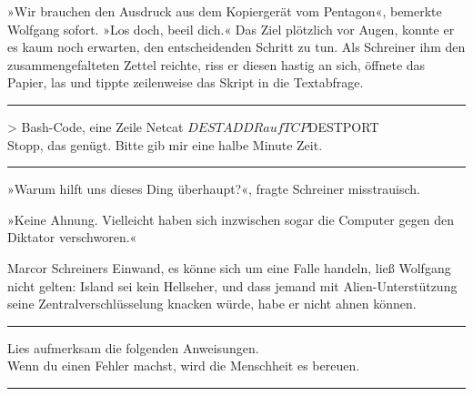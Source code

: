 »Wir brauchen den Ausdruck aus dem Kopiergerät vom Pentagon«, bemerkte Wolfgang sofort. »Los doch, beeil dich.« Das Ziel plötzlich vor Augen, konnte er es kaum noch erwarten, den entscheidenden Schritt zu tun. Als Schreiner ihm den zusammengefalteten Zettel reichte, riss er diesen hastig an sich, öffnete das Papier, las und tippte zeilenweise das Skript in die Textabfrage.

\noindent \parbox{\textwidth}{ \vspace{3ex} \hrule \vspace{3ex}

    \begin{tiny}
    \begin{ttfamily}

\noindent > Bash-Code, eine Zeile Netcat $DESTADDR auf TCP $DESTPORT\\
\noindent Stopp, das genügt. Bitte gib mir eine halbe Minute Zeit.

    \end{ttfamily}
    \end{tiny}

\vspace{3ex} \hrule \vspace{3ex} }

»Warum hilft uns dieses Ding überhaupt?«, fragte Schreiner misstrauisch.

»Keine Ahnung. Vielleicht haben sich inzwischen sogar die Computer gegen den Diktator verschworen.«

Marcor Schreiners Einwand, es könne sich um eine Falle handeln, ließ Wolfgang nicht gelten: Island sei kein Hellseher, und dass jemand mit Alien-Unterstützung seine Zentralverschlüsselung knacken würde, habe er nicht ahnen können.

\noindent \parbox{\textwidth}{ \vspace{3ex} \hrule \vspace{3ex}

    \begin{tiny}
    \begin{ttfamily}

\noindent Lies aufmerksam die folgenden Anweisungen.\\
\noindent Wenn du einen Fehler machst, wird die Menschheit es bereuen.

    \end{ttfamily}
    \end{tiny}

\vspace{3ex} \hrule \vspace{3ex} }


